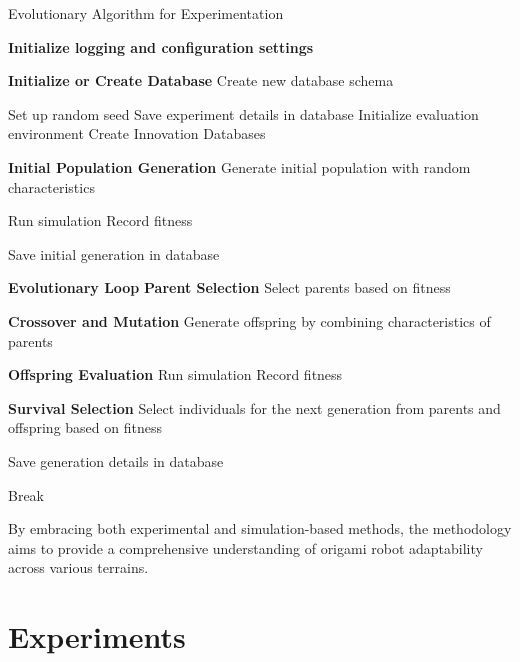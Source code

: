 \documentclass{sigchi}
\begin{document}
\begin{algorithm}
\caption{Evolutionary Algorithm for Experimentation}
\begin{algorithmic}[1]
\STATE \textbf{Initialize logging and configuration settings}

\STATE \textbf{Initialize or Create Database}
    \STATE Create new database schema
\ENDIF

    \STATE Set up random seed
    \STATE Save experiment details in database
    \STATE Initialize evaluation environment
    \STATE Create Innovation Databases

    \STATE \textbf{Initial Population Generation}
    \STATE Generate initial population with random characteristics

        \STATE Run simulation
        \STATE Record fitness
    \ENDFOR

    \STATE Save initial generation in database

    \STATE \textbf{Evolutionary Loop}
        \STATE \textbf{Parent Selection}
        \STATE Select parents based on fitness

        \STATE \textbf{Crossover and Mutation}
        \STATE Generate offspring by combining characteristics of parents

        \STATE \textbf{Offspring Evaluation}
            \STATE Run simulation
            \STATE Record fitness
        \ENDFOR

        \STATE \textbf{Survival Selection}
        \STATE Select individuals for the next generation from parents and offspring based on fitness

        \STATE Save generation details in database

            \STATE Break
        \ENDIF
    \ENDFOR
\ENDFOR
\end{algorithmic}
\end{algorithm}



By embracing both experimental and simulation-based methods, the methodology aims to provide a comprehensive understanding of origami robot adaptability across various terrains.



\section{Experiments}
\end{document}
